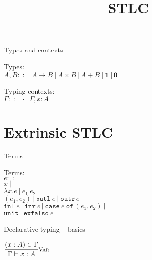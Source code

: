 \documentclass{beamer}
\title{STLC}
\newcommand{\pipe}{\ |\ }
\newcommand{\Fun}[2]{#1 \to #2}
\newcommand{\Prod}[2]{#1 \times #2}
\newcommand{\Sum}[2]{#1 + #2}
\newcommand{\Unit}{\textbf{1}}
\newcommand{\Empty}{\textbf{0}}
\newcommand{\fun}[2]{\lambda #1. #2}
\newcommand{\app}[2]{#1\ #2}
\newcommand{\pair}[2]{(#1, #2)}
\newcommand{\outl}[1][]{\texttt{outl}\ #1}
\newcommand{\outr}[1][]{\texttt{outr}\ #1}
\newcommand{\inl}[1][]{\texttt{inl}\ #1}
\newcommand{\inr}[1][]{\texttt{inr}\ #1}
\newcommand{\case}[3]{\texttt{case}\ #1\ \texttt{of}\ (#2, #3)}
\newcommand{\unit}{\texttt{unit}}
\newcommand{\exfalso}[1][]{\texttt{exfalso}\ #1}
\newcommand{\fulltyping}[3]{#1 \vdash #2 : #3}
\newcommand{\typing}[2]{\fulltyping{\Gamma}{#1}{#2}}
\newcommand{\infrule}[3][]{\displaystyle \frac{#2}{#3} \textsc{\footnotesize{#1}}}
\newcommand{\emptytypingctx}{\cdot}
\newcommand{\extend}[3]{#1, #2 : #3}
\newcommand{\sidecond}[1]{#1}
\begin{document}
\begin{frame}{Types and contexts}

Types: \\
$A, B ::= \Fun{A}{B} \pipe \Prod{A}{B} \pipe \Sum{A}{B} \pipe \Unit \pipe \Empty$

\vspace{2em}

Typing contexts: \\
$\Gamma ::= \emptytypingctx \pipe \extend{\Gamma}{x}{A}$
  
\end{frame}

\section{Extrinsic STLC}

\begin{frame}{Terms}

Terms: \\
$e ::=$ \\
\qquad $x \pipe$ \\
\qquad $\fun{x}{e} \pipe \app{e_1}{e_2} \pipe$ \\
\qquad $\pair{e_1}{e_2} \pipe \outl[e] \pipe \outr[e] \pipe$ \\
\qquad $\inl[e] \pipe \inr[e] \pipe \case{e}{e_1}{e_2} \pipe$ \\
\qquad $\unit \pipe \exfalso{e}$

\end{frame}

\begin{frame}{Declarative typing -- basics}

\begin{center}
  $\infrule[Var]{\sidecond{(x : A) \in \Gamma}}{\typing{x}{A}}$
\end{center}

\end{frame}
\end{document}
